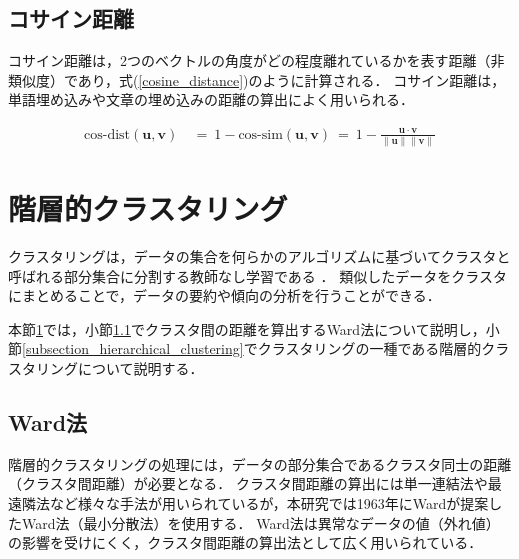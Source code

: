 \documentclass[12pt,a4j]{jreport}
\begin{document}
\subsection{コサイン距離}
\label{subsection_cosine_distance}

コサイン距離は，2つのベクトルの角度がどの程度離れているかを表す距離（非類似度）であり，式(\ref{cosine_distance})のように計算される．
コサイン距離は，単語埋め込みや文章の埋め込みの距離の算出によく用いられる．

\begin{align}
  \text{cos-dist}\left(\bm{u}, \bm{v}\right) ~&=~
  1 -
  \text{cos-sim}\left(\bm{u}, \bm{v}\right) ~=~
  1 - \frac{\bm{u} \cdot \bm{v}}{\|\bm{u}\|\|\bm{v}\|}
  \label{cosine_distance}
\end{align}

\section{階層的クラスタリング}
\label{section_clustering}
クラスタリングは，データの集合を何らかのアルゴリズムに基づいてクラスタと呼ばれる部分集合に分割する教師なし学習である
．
類似したデータをクラスタにまとめることで，データの要約や傾向の分析を行うことができる．

本節\ref{section_clustering}では，小節\ref{subsection_wards_method}でクラスタ間の距離を算出するWard法について説明し，小節\ref{subsection_hierarchical_clustering}でクラスタリングの一種である階層的クラスタリングについて説明する．



\subsection{Ward法}
\label{subsection_wards_method}
階層的クラスタリングの処理には，データの部分集合であるクラスタ同士の距離（クラスタ間距離）が必要となる．
クラスタ間距離の算出には単一連結法や最遠隣法など様々な手法が用いられているが，本研究では1963年にWardが提案したWard法（最小分散法）を使用する\cite{murtagh_wards_2014}．
Ward法は異常なデータの値（外れ値）の影響を受けにくく，クラスタ間距離の算出法として広く用いられている．
\end{document}
